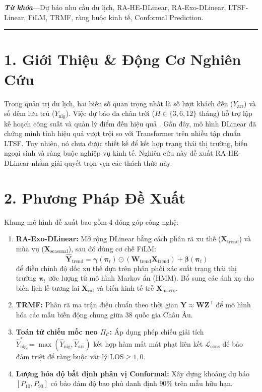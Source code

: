 \vspace{0.3cm}
\noindent \textbf{\textit{Từ khóa}}---Dự báo nhu cầu du lịch, RA-HE-DLinear, RA-Exo-DLinear, LTSF-Linear, FiLM, TRMF, ràng buộc kinh tế, Conformal Prediction.

\vspace{0.5cm}
\hrule
\vspace{0.5cm}

\section*{1. Giới Thiệu \& Động Cơ Nghiên Cứu}
Trong quản trị du lịch, hai biến số quan trọng nhất là số lượt khách đến ($Y_{\text{arr}}$) và số đêm lưu trú ($Y_{\text{nig}}$). Việc dự báo đa chân trời ($H \in \{3, 6, 12\}$ tháng) hỗ trợ lập kế hoạch công suất và quản lý điểm đến hiệu quả \cite{song2021tourism}. Gần đây, mô hình DLinear \cite{zeng2023dlinear} đã chứng minh tính hiệu quả vượt trội so với Transformer trên nhiều tập chuẩn LTSF. Tuy nhiên, nó chưa được thiết kế để kết hợp trạng thái thị trường, biến ngoại sinh và ràng buộc nghiệp vụ kinh tế. Nghiên cứu này đề xuất RA-HE-DLinear nhằm giải quyết trọn vẹn các thách thức này.

\section*{2. Phương Pháp Đề Xuất}
Khung mô hình đề xuất bao gồm 4 đóng góp công nghệ:
\begin{enumerate}
    \item \textbf{RA-Exo-DLinear:} Mở rộng DLinear bằng cách phân rã xu thế ($\mathbf{X}_{\text{trend}}$) và mùa vụ ($\mathbf{X}_{\text{seasonal}}$), sau đó dùng cơ chế FiLM:
    \begin{equation}
        \hat{\mathbf{Y}}_{\text{trend}} = \bm{\gamma}(\bm{\pi}_t) \odot (\mathbf{W}_{\text{trend}} \mathbf{X}_{\text{trend}}) + \bm{\beta}(\bm{\pi}_t)
    \end{equation}
    để điều chỉnh độ dốc xu thế dựa trên phân phối xác suất trạng thái thị trường $\bm{\pi}_t$ ước lượng từ mô hình Markov ẩn (HMM). Bổ sung các ánh xạ cho biến lịch lễ tương lai $\mathbf{X}_{\text{cal}}$ và biến kinh tế trễ $\mathbf{X}_{\text{macro}}$.
    \item \textbf{TRMF:} Phân rã ma trận điều chuẩn theo thời gian $\mathbf{Y} \approx \mathbf{W}\mathbf{Z}^\top$ để mô hình hóa các mẫu biến động chung giữa 38 quốc gia Châu Âu.
    \item \textbf{Toán tử chiếu mốc neo $\Pi_{\mathcal{C}}$:} Áp dụng phép chiếu giải tích $\hat{Y}_{\text{nig}}^* = \max(\hat{Y}_{\text{nig}}, \hat{Y}_{\text{arr}})$ kết hợp hàm mất mát phạt liên kết $\mathcal{L}_{\text{cons}}$ để bảo đảm triệt để ràng buộc vật lý $\text{LOS} \ge 1{,}0$.
    \item \textbf{Lượng hóa độ bất định phân vị Conformal:} Xây dựng khoảng dự báo $[P_{10}, P_{90}]$ có bảo đảm độ bao phủ danh định $90\%$ trên mẫu hữu hạn.
\end{enumerate}

